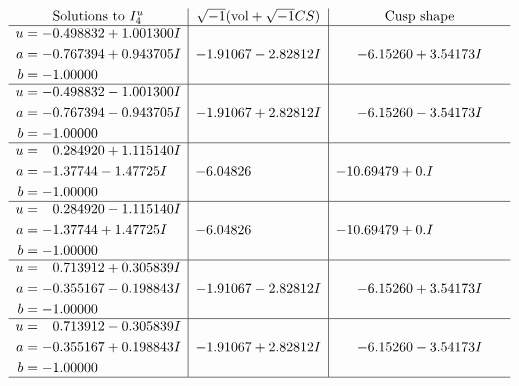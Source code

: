 \documentclass[1p]{elsarticle_modified}
\theoremstyle{definition}
\newcommand{\I}{\sqrt{-1}}
\begin{document}
$$\begin{array}{c|c|c}  
\text{Solutions to }I^u_{4}& \I (\text{vol} + \sqrt{-1}CS) & \text{Cusp shape}\\
 \hline 
\begin{aligned}
u &= -0.498832 + 1.001300 I \\
a &= -0.767394 + 0.943705 I \\
b &= -1.00000\phantom{ +0.000000I}\end{aligned}
 & -1.91067 - 2.82812 I & -6.15260 + 3.54173 I \\ \hline\begin{aligned}
u &= -0.498832 - 1.001300 I \\
a &= -0.767394 - 0.943705 I \\
b &= -1.00000\phantom{ +0.000000I}\end{aligned}
 & -1.91067 + 2.82812 I & -6.15260 - 3.54173 I \\ \hline\begin{aligned}
u &= \phantom{-}0.284920 + 1.115140 I \\
a &= -1.37744 - 1.47725 I \\
b &= -1.00000\phantom{ +0.000000I}\end{aligned}
 & -6.04826\phantom{ +0.000000I} & -10.69479 + 0. I\phantom{ +0.000000I} \\ \hline\begin{aligned}
u &= \phantom{-}0.284920 - 1.115140 I \\
a &= -1.37744 + 1.47725 I \\
b &= -1.00000\phantom{ +0.000000I}\end{aligned}
 & -6.04826\phantom{ +0.000000I} & -10.69479 + 0. I\phantom{ +0.000000I} \\ \hline\begin{aligned}
u &= \phantom{-}0.713912 + 0.305839 I \\
a &= -0.355167 - 0.198843 I \\
b &= -1.00000\phantom{ +0.000000I}\end{aligned}
 & -1.91067 - 2.82812 I & -6.15260 + 3.54173 I \\ \hline\begin{aligned}
u &= \phantom{-}0.713912 - 0.305839 I \\
a &= -0.355167 + 0.198843 I \\
b &= -1.00000\phantom{ +0.000000I}\end{aligned}
 & -1.91067 + 2.82812 I & -6.15260 - 3.54173 I\\
 \hline 
 \end{array}$$\newpage
\end{document}
